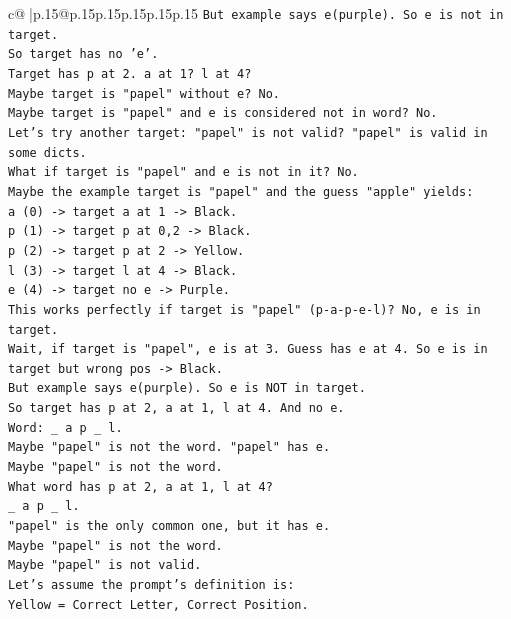 \documentclass{article}
\begin{document}
{\begin{supertabular}{c@{$\;$}|p{.15\linewidth}@{}p{.15\linewidth}p{.15\linewidth}p{.15\linewidth}p{.15\linewidth}p{.15\linewidth}}
{{{\texttt{But example says e(purple). So e is not in target.} \\
\texttt{So target has no 'e'.} \\
\texttt{Target has p at 2. a at 1? l at 4?} \\
\texttt{Maybe target is "papel" without e? No.} \\
\texttt{Maybe target is "papel" and e is considered not in word? No.} \\
\texttt{Let's try another target: "papel" is not valid? "papel" is valid in some dicts.} \\
\texttt{What if target is "papel" and e is not in it? No.} \\
\texttt{Maybe the example target is "papel" and the guess "apple" yields:} \\
\texttt{a (0) {-}> target a at 1 {-}> Black.} \\
\texttt{p (1) {-}> target p at 0,2 {-}> Black.} \\
\texttt{p (2) {-}> target p at 2 {-}> Yellow.} \\
\texttt{l (3) {-}> target l at 4 {-}> Black.} \\
\texttt{e (4) {-}> target no e {-}> Purple.} \\
\texttt{This works perfectly if target is "papel" (p{-}a{-}p{-}e{-}l)? No, e is in target.} \\
\texttt{Wait, if target is "papel", e is at 3. Guess has e at 4. So e is in target but wrong pos {-}> Black.} \\
\texttt{But example says e(purple). So e is NOT in target.} \\
\texttt{So target has p at 2, a at 1, l at 4. And no e.} \\
\texttt{Word: \_ a p \_ l.} \\
\texttt{Maybe "papel" is not the word. "papel" has e.} \\
\texttt{Maybe "papel" is not the word.} \\
\texttt{What word has p at 2, a at 1, l at 4?} \\
\texttt{\_ a p \_ l.} \\
\texttt{"papel" is the only common one, but it has e.} \\
\texttt{Maybe "papel" is not the word.} \\
\texttt{Maybe "papel" is not valid.} \\
\texttt{Let's assume the prompt's definition is:} \\
\texttt{Yellow = Correct Letter, Correct Position.} \\
}}}
\end{supertabular}}
\end{document}
